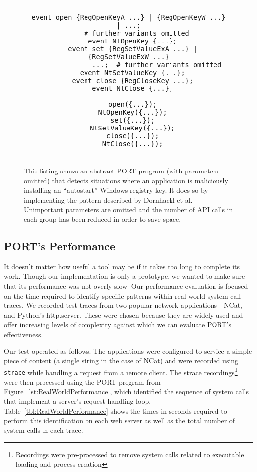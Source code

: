 \begin{figure}[H]
\centering
\begin{tabular}{c}
\begin{lstlisting}[gobble=2]
  event open {RegOpenKeyA ...} | {RegOpenKeyW ...} | ...;
    # further variants omitted
  event NtOpenKey {...};
  event set {RegSetValueExA ...} | {RegSetValueExW ...}
            | ...;  # further variants omitted
  event NtSetValueKey {...};
  event close {RegCloseKey ...};
  event NtClose {...};

  open({...});
  NtOpenKey({...});
  set({...});
  NtSetValueKey({...});
  close({...});
  NtClose({...});
\end{lstlisting}
\end{tabular}
  \caption{This listing shows an abstract PORT program (with parameters
  omitted) that detects situations where an application is maliciously
  installing an ``autostart'' Windows registry key.  It does so by
  implementing the pattern described by Dornhackl et al.  Unimportant
  parameters are omitted and the number of API calls in each group has been
  reduced in order to save space.}
\label{lst:PORTRegDetect}
\end{figure}


\subsection{PORT's Performance}

It doesn't matter how useful a tool may be
if it takes too long to complete its work.
Though our implementation is
only a prototype, we wanted to make sure that its performance was not
overly slow.
Our performance evaluation
is focused on the time required
to identify specific
patterns within real world system call traces.
We recorded test traces
from two popular network applications -
NCat,
and
Python's http.server.
These
were chosen because they are widely used and
offer increasing levels of complexity against which we can evaluate
PORT's effectiveness.

Our test operated as follows.  The applications were configured to service
a simple piece of content (a single string in the case of NCat) and were
recorded using {\tt strace} while handling a request from a remote client.
The strace
recordings\footnote{Recordings were pre-processed to remove system calls
related to executable loading and process creation} were then processed using the PORT program from
Figure~\ref{lst:RealWorldPerformance},  which
identified the sequence of system calls that implement
a server's request handling
loop.  Table~\ref{tbl:RealWorldPerformance}
shows the times in seconds required to perform this identification on each
web server as well as the total number of system calls in each trace.

